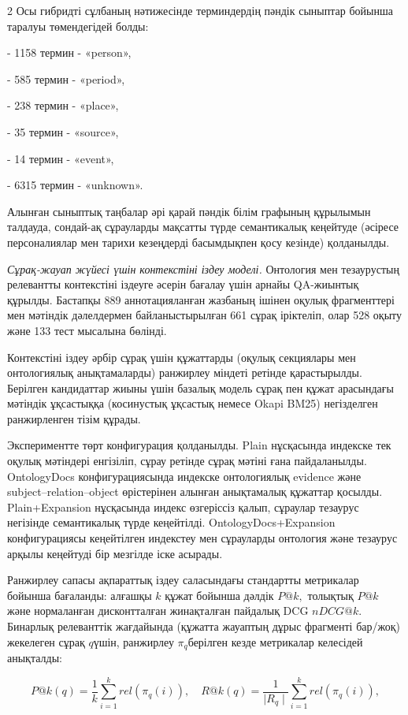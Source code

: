 \begin{multicols}{2}
Осы гибридті сұлбаның нәтижесінде терминдердің пәндік сыныптар бойынша
таралуы төмендегідей болды:

- 1158 термин - «person»,

- 585 термин - «period»,

- 238 термин - «place»,

- 35 термин - «source»,

- 14 термин - «event»,

- 6315 термин - «unknown».

Алынған сыныптық таңбалар әрі қарай пәндік білім графының құрылымын
талдауда, сондай-ақ сұрауларды мақсатты түрде семантикалық кеңейтуде
(әсіресе персоналиялар мен тарихи кезеңдерді басымдықпен қосу кезінде)
қолданылды.

\emph{Сұрақ-жауап жүйесі үшін контекстіні іздеу моделі.} Онтология мен
тезаурустың релевантты контекстіні іздеуге әсерін бағалау үшін арнайы
QA-жиынтық құрылды. Бастапқы 889 аннотацияланған жазбаның ішінен оқулық
фрагменттері мен мәтіндік дәлелдермен байланыстырылған 661 сұрақ
іріктеліп, олар 528 оқыту және 133 тест мысалына бөлінді.

Контекстіні іздеу әрбір сұрақ үшін құжаттарды (оқулық секциялары мен
онтологиялық анықтамаларды) ранжирлеу міндеті ретінде қарастырылды.
Берілген кандидаттар жиыны үшін базалық модель сұрақ пен құжат
арасындағы мәтіндік ұқсастыққа (косинустық ұқсастық немесе Okapi BM25)
негізделген ранжирленген тізім құрады.

Экспериментте төрт конфигурация қолданылды. Plain нұсқасында индекске
тек оқулық мәтіндері енгізіліп, сұрау ретінде сұрақ мәтіні ғана
пайдаланылды. OntologyDocs конфигурациясында индекске онтологиялық
evidence және subject--relation--object өрістерінен алынған анықтамалық
құжаттар қосылды. Plain+Expansion нұсқасында индекс өзгеріссіз қалып,
сұраулар тезаурус негізінде семантикалық түрде кеңейтілді.
OntologyDocs+Expansion конфигурациясы кеңейтілген индекстеу мен
сұрауларды онтология және тезаурус арқылы кеңейтуді бір мезгілде іске
асырады.

Ранжирлеу сапасы ақпараттық іздеу саласындағы стандартты метрикалар
бойынша бағаланды: алғашқы \(k\) құжат бойынша дәлдік \(P@k,\) толықтық
\(P@k\) және нормаланған дисконтталған жинақталған пайдалық DCG
\(nDCG@k\). Бинарлық релеванттік жағдайында (құжатта жауаптың дұрыс
фрагменті бар/жоқ) жекелеген сұрақ \(q\)үшін, ранжирлеу
\(\pi_{q}\)берілген кезде метрикалар келесідей анықталды:
\end{multicols}
\vspace{-1em}
\[{P@k(q) = \frac{1}{k}\sum_{i = 1}^{k}{rel}(\pi_{q}(i)),\quad
}{R@k(q) = \frac{1}{\mid R_{q} \mid}\sum_{i = 1}^{k}{rel}(\pi_{q}(i)),
}\]

